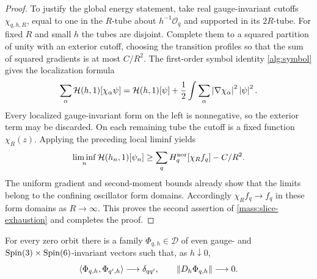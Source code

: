 \begin{proof}
To justify the global energy statement, take real gauge-invariant
cutoffs \(\chi_{q,h,R}\), equal to one in the \(R\)-tube about
\(h^{-1}\mathcal O_q\) and supported in its \(2R\)-tube. For
fixed \(R\) and small \(h\) the tubes are disjoint. Complete them
to a squared partition of unity with an exterior cutoff, choosing
the transition profiles so that the sum of squared gradients is
at most \(C/R^2\). The first-order symbol identity
\eqref{alg:symbol} gives the localization formula
\begin{equation}
\label{mass:IMS}
 \sum_\alpha\mathcal H(h,1)[\chi_\alpha\psi]
 =\mathcal H(h,1)[\psi]
    +\frac12\int\sum_\alpha\left\lvert \nabla\chi_\alpha\right\rvert^2\left\lvert \psi\right\rvert^2.
\end{equation}
Every localized gauge-invariant form on the left is nonnegative,
so the exterior term may be discarded. On each remaining tube the
cutoff is a fixed function \(\chi_R(z)\). Applying the preceding
local liminf yields
\[
 \liminf_n\mathcal H(h_n,1)[\psi_n]
 \geq\sum_qH_q^{\mathrm{nor}}[\chi_Rf_q]-C/R^2.
\]
The uniform gradient and second-moment bounds already show that
the limits belong to the confining oscillator form domains.
Accordingly \(\chi_Rf_q\to f_q\) in these form domains as
\(R\to\infty\). This proves the second assertion of
\eqref{mass:slice-exhaustion} and completes the proof.
\end{proof}

\begin{lemma}
\label{mass:vacuum-recovery}
For every zero orbit there is a family \(\Phi_{q,h}\in\mathcal D\)
of even gauge- and \(\operatorname{Spin}(3)\times\operatorname{Spin}(6)\)-invariant vectors
such that, as \(h\downarrow0\),
\begin{equation}
\label{mass:vacuum-recovery-eq}
 \left\langle \Phi_{q,h},\Phi_{q',h}\right\rangle\longrightarrow\delta_{qq'},
 \qquad \left\lVert D_h\Phi_{q,h}\right\rVert\longrightarrow0.
\end{equation}
\end{lemma}

